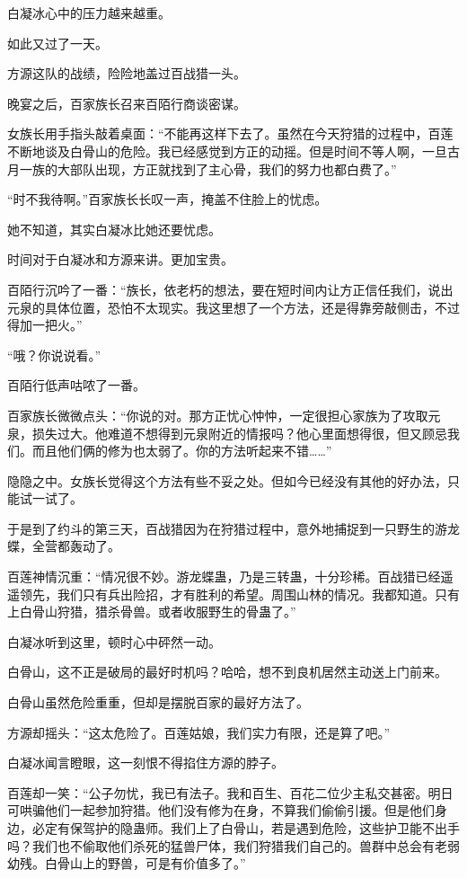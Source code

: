 \begin{this_body}
白凝冰心中的压力越来越重。

如此又过了一天。

方源这队的战绩，险险地盖过百战猎一头。

晚宴之后，百家族长召来百陌行商谈密谋。

女族长用手指头敲着桌面：“不能再这样下去了。虽然在今天狩猎的过程中，百莲不断地谈及白骨山的危险。我已经感觉到方正的动摇。但是时间不等人啊，一旦古月一族的大部队出现，方正就找到了主心骨，我们的努力也都白费了。”

“时不我待啊。”百家族长长叹一声，掩盖不住脸上的忧虑。

她不知道，其实白凝冰比她还要忧虑。

时间对于白凝冰和方源来讲。更加宝贵。

百陌行沉吟了一番：“族长，依老朽的想法，要在短时间内让方正信任我们，说出元泉的具体位置，恐怕不太现实。我这里想了一个方法，还是得靠旁敲侧击，不过得加一把火。”

“哦？你说说看。”

百陌行低声咕哝了一番。

百家族长微微点头：“你说的对。那方正忧心忡忡，一定很担心家族为了攻取元泉，损失过大。他难道不想得到元泉附近的情报吗？他心里面想得很，但又顾忌我们。而且他们俩的修为也太弱了。你的方法听起来不错……”

隐隐之中。女族长觉得这个方法有些不妥之处。但如今已经没有其他的好办法，只能试一试了。

于是到了约斗的第三天，百战猎因为在狩猎过程中，意外地捕捉到一只野生的游龙蝶，全营都轰动了。

百莲神情沉重：“情况很不妙。游龙蝶蛊，乃是三转蛊，十分珍稀。百战猎已经遥遥领先，我们只有兵出险招，才有胜利的希望。周围山林的情况。我都知道。只有上白骨山狩猎，猎杀骨兽。或者收服野生的骨蛊了。”

白凝冰听到这里，顿时心中砰然一动。

白骨山，这不正是破局的最好时机吗？哈哈，想不到良机居然主动送上门前来。

白骨山虽然危险重重，但却是摆脱百家的最好方法了。

方源却摇头：“这太危险了。百莲姑娘，我们实力有限，还是算了吧。”

白凝冰闻言瞪眼，这一刻恨不得掐住方源的脖子。

百莲却一笑：“公子勿忧，我已有法子。我和百生、百花二位少主私交甚密。明日可哄骗他们一起参加狩猎。他们没有修为在身，不算我们偷偷引援。但是他们身边，必定有保驾护的隐蛊师。我们上了白骨山，若是遇到危险，这些护卫能不出手吗？我们也不偷取他们杀死的猛兽尸体，我们狩猎我们自己的。兽群中总会有老弱幼残。白骨山上的野兽，可是有价值多了。”


\end{this_body}
